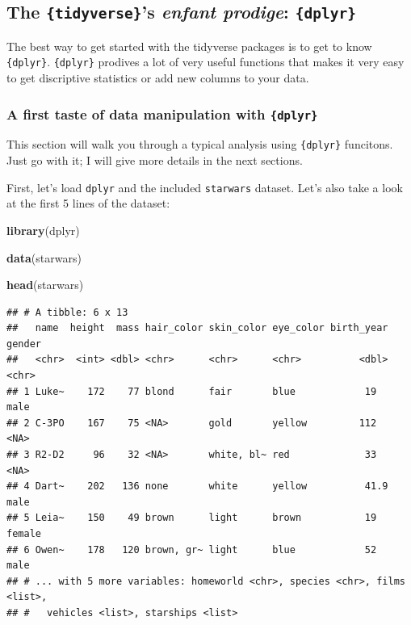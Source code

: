 \documentclass[]{gitbook}
\newenvironment{Shaded}{\begin{snugshade}}{\end{snugshade}}
\newcommand{\KeywordTok}[1]{\textcolor[rgb]{0.13,0.29,0.53}{\textbf{#1}}}
\newcommand{\NormalTok}[1]{#1}
\theoremstyle{definition}
\theoremstyle{definition}
\theoremstyle{definition}
\theoremstyle{remark}
\begin{document}
\hypertarget{the-tidyverses-enfant-prodige-dplyr}{%
\subsection{\texorpdfstring{The \texttt{\{tidyverse\}}'s \emph{enfant
prodige}:
\texttt{\{dplyr\}}}{The \{tidyverse\}'s enfant prodige: \{dplyr\}}}\label{the-tidyverses-enfant-prodige-dplyr}}

The best way to get started with the tidyverse packages is to get to
know \texttt{\{dplyr\}}. \texttt{\{dplyr\}} prodives a lot of very
useful functions that makes it very easy to get discriptive statistics
or add new columns to your data.

\hypertarget{a-first-taste-of-data-manipulation-with-dplyr}{%
\subsubsection{\texorpdfstring{A first taste of data manipulation with
\texttt{\{dplyr\}}}{A first taste of data manipulation with \{dplyr\}}}\label{a-first-taste-of-data-manipulation-with-dplyr}}

This section will walk you through a typical analysis using
\texttt{\{dplyr\}} funcitons. Just go with it; I will give more details
in the next sections.

First, let's load \texttt{dplyr} and the included \texttt{starwars}
dataset. Let's also take a look at the first 5 lines of the dataset:

\begin{Shaded}
\begin{Highlighting}[]
\KeywordTok{library}\NormalTok{(dplyr)}

\KeywordTok{data}\NormalTok{(starwars)}

\KeywordTok{head}\NormalTok{(starwars)}
\end{Highlighting}
\end{Shaded}

\begin{verbatim}
## # A tibble: 6 x 13
##   name  height  mass hair_color skin_color eye_color birth_year gender
##   <chr>  <int> <dbl> <chr>      <chr>      <chr>          <dbl> <chr> 
## 1 Luke~    172    77 blond      fair       blue            19   male  
## 2 C-3PO    167    75 <NA>       gold       yellow         112   <NA>  
## 3 R2-D2     96    32 <NA>       white, bl~ red             33   <NA>  
## 4 Dart~    202   136 none       white      yellow          41.9 male  
## 5 Leia~    150    49 brown      light      brown           19   female
## 6 Owen~    178   120 brown, gr~ light      blue            52   male  
## # ... with 5 more variables: homeworld <chr>, species <chr>, films <list>,
## #   vehicles <list>, starships <list>
\end{verbatim}
\end{document}
